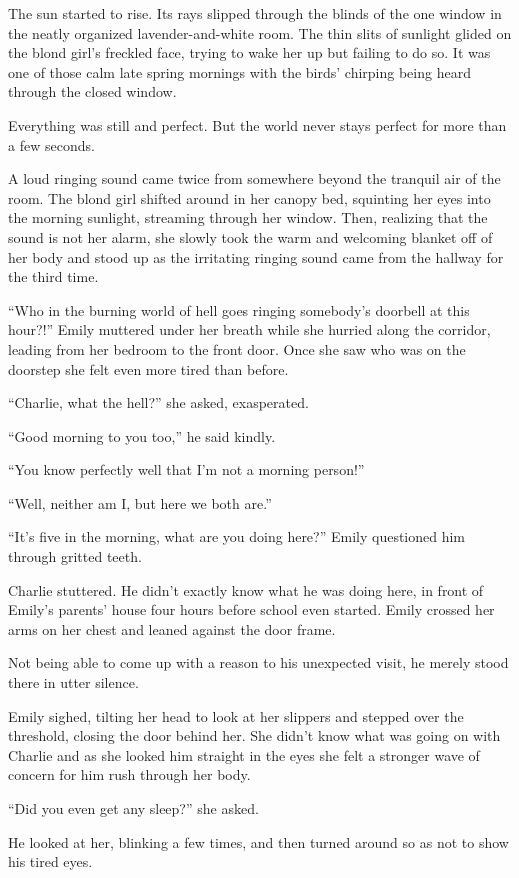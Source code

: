 The sun started to rise. Its rays slipped through the blinds of the one window in the neatly organized lavender-and-white room. The thin slits of sunlight glided on the blond girl’s freckled face, trying to wake her up but failing to do so. It was one of those calm late spring mornings with the birds’ chirping being heard through the closed window.

Everything was still and perfect. But the world never stays perfect for more than a few seconds.

A loud ringing sound came twice from somewhere beyond the tranquil air of the room. The blond girl shifted around in her canopy bed, squinting her eyes into the morning sunlight, streaming through her window. Then, realizing that the sound is not her alarm, she slowly took the warm and welcoming blanket off of her body and stood up as the irritating ringing sound came from the hallway for the third time.

“Who in the burning world of hell goes ringing somebody’s doorbell at this hour?!” Emily muttered under her breath while she hurried along the corridor, leading from her bedroom to the front door. Once she saw who was on the doorstep she felt even more tired than before.

“Charlie, what the hell?” she asked, exasperated.

“Good morning to you too,” he said kindly.

“You know perfectly well that I’m not a morning person!”

“Well, neither am I, but here we both are.”

“It’s five in the morning, what are you doing here?” Emily questioned him through gritted teeth.

Charlie stuttered. He didn’t exactly know what he was doing here, in front of Emily’s parents’ house four hours before school even started. Emily crossed her arms on her chest and leaned against the door frame.

Not being able to come up with a reason to his unexpected visit, he merely stood there in utter silence.

Emily sighed, tilting her head to look at her slippers and stepped over the threshold, closing the door behind her. She didn’t know what was going on with Charlie and as she looked him straight in the eyes she felt a stronger wave of concern for him rush through her body.

“Did you even get any sleep?” she asked.

He looked at her, blinking a few times, and then turned around so as not to show his tired eyes.

